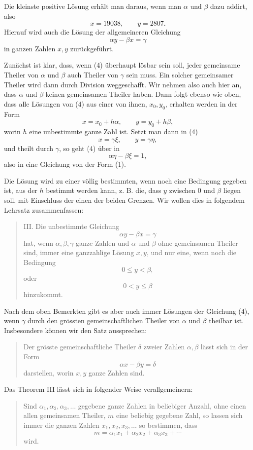 \documentclass[11pt]{article}
\begin{document}
Die kleinste positive Lösung erhält man daraus, wenn man $\alpha$ und $\beta$ dazu addirt, also
\[
        x=19038,
        \qquad
        y=2807.
\]
Hierauf wird auch die Lösung der allgemeineren Gleichung
\[
\tag{4}        \alpha y-\beta x=\gamma
\]
in ganzen Zahlen $x,y$ zurückgeführt.

Zunächst ist klar, dass, wenn (4) überhaupt lösbar sein soll, jeder gemeinsame Theiler von $\alpha$ und $\beta$ auch Theiler von $\gamma$ sein muss. Ein solcher gemeinsamer Theiler wird dann durch Division weggeschafft. Wir nehmen also auch hier an, dass $\alpha$ und $\beta$ keinen gemeinsamen Theiler haben. Dann folgt ebenso wie oben, dass alle Lösungen von (4) aus einer von ihnen, $x_0,y_0$, erhalten werden in der Form
\[
        x=x_0+h\alpha,
        \qquad
        y=y_0+h\beta,
\]
worin $h$ eine unbestimmte ganze Zahl ist. Setzt man dann in (4)
\[
        x=\gamma\xi,
        \qquad
        y=\gamma\eta,
\]
und theilt durch $\gamma$, so geht (4) über in
\[
        \alpha\eta-\beta\xi=1,
\]
also in eine Gleichung von der Form (1).

Die Lösung wird zu einer völlig bestimmten, wenn noch eine Bedingung gegeben ist, aus der $h$ bestimmt werden kann, z. B. die, dass $y$ zwischen $0$ und $\beta$ liegen soll, mit Einschluss der einen der beiden Grenzen. Wir wollen dies in folgendem Lehrsatz zusammenfassen:

\begin{quote}
III. Die unbestimmte Gleichung
\[
        \alpha y-\beta x=\gamma
\]
hat, wenn $\alpha,\beta,\gamma$ ganze Zahlen und $\alpha$ und $\beta$ ohne gemeinsamen Theiler sind, immer eine ganzzahlige Lösung $x,y$, und nur eine, wenn noch die Bedingung
\[
        0\le y<\beta,
\]
oder
\[
        0<y\le \beta
\]
hinzukommt.
\end{quote}

Nach dem oben Bemerkten gibt es aber auch immer Lösungen der Gleichung (4), wenn $\gamma$ durch den grössten gemeinschaftlichen Theiler von $\alpha$ und $\beta$ theilbar ist. Insbesondere können wir den Satz aussprechen:
\begin{quote}
Der grösste gemeinschaftliche Theiler $\delta$ zweier Zahlen $\alpha,\beta$ lässt sich in der Form
\[
        \alpha x-\beta y=\delta
\]
darstellen, worin $x,y$ ganze Zahlen sind.
\end{quote}

Das Theorem III lässt sich in folgender Weise verallgemeinern:
\begin{quote}
Sind $\alpha_1,\alpha_2,\alpha_3,\ldots$ gegebene ganze Zahlen in beliebiger Anzahl, ohne einen allen gemeinsamen Theiler, $m$ eine beliebig gegebene Zahl, so lassen sich immer die ganzen Zahlen $x_1,x_2,x_3,\ldots$ so bestimmen, dass
\[
\tag{5}        m=\alpha_1x_1+\alpha_2x_2+\alpha_3x_3+\cdots
\]
wird.
\end{quote}
\end{document}
